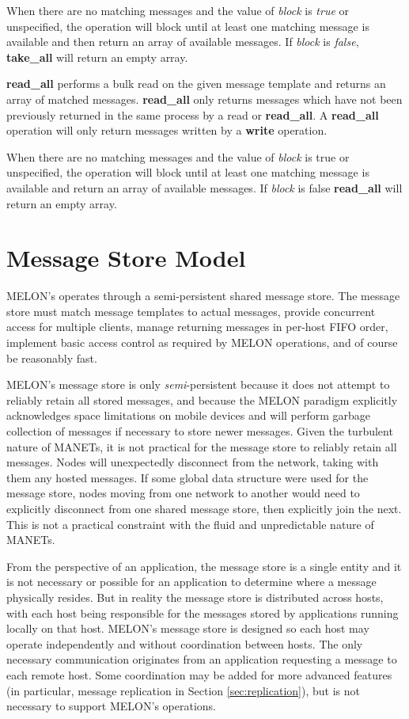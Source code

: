 When there are no matching messages and the value of \textit{block} is \textit{true} or unspecified, the operation will block until at least one matching message is available and then return an array of available messages. If \textit{block} is \textit{false}, \textbf{take\_all} will return an empty array.

\textbf{read\_all} performs a bulk read on the given message template and returns an array of matched messages. \textbf{read\_all} only returns messages which have not been previously returned in the same process by a read or \textbf{read\_all}. A \textbf{read\_all} operation will only return messages written by a \textbf{write} operation.

When there are no matching messages and the value of \textit{block} is true or unspecified, the operation will block until at least one matching message is available and return an array of available messages. If \textit{block} is false \textbf{read\_all} will return an empty array.

\section{Message Store Model}

MELON's operates through a semi-persistent shared message store. The message store must match message templates to actual messages, provide concurrent access for multiple clients, manage returning messages in per-host FIFO order, implement basic access control as required by MELON operations, and of course be reasonably fast.

MELON's message store is only \textit{semi}-persistent because it does not attempt to reliably retain all stored messages, and because the MELON paradigm explicitly acknowledges space limitations on mobile devices and will perform garbage collection of messages if necessary to store newer messages. Given the turbulent nature of MANETs, it is not practical for the message store to reliably retain all messages. Nodes will unexpectedly disconnect from the network, taking with them any hosted messages. If some global data structure were used for the message store, nodes moving from one network to another would need to explicitly disconnect from one shared message store, then explicitly join the next. This is not a practical constraint with the fluid and unpredictable nature of MANETs.

From the perspective of an application, the message store is a single entity and it is not necessary or possible for an application to determine where a message physically resides. But in reality the message store is distributed across hosts, with each host being responsible for the messages stored by applications running locally on that host. MELON's message store is designed so each host may operate independently and without coordination between hosts. The only necessary communication originates from an application requesting a message to each remote host. Some coordination may be added for more advanced features (in particular, message replication in Section \ref{sec:replication}), but is not necessary to support MELON's operations.

